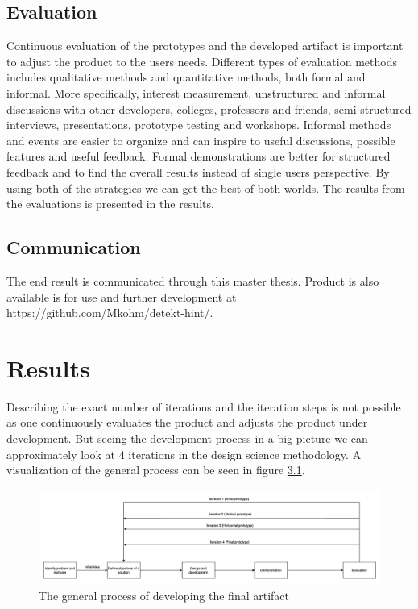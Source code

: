 \documentclass{report}
\begin{document}
\section{Evaluation}
Continuous evaluation of the prototypes and the developed artifact is important to adjust the product to the users needs. Different types of evaluation methods includes qualitative methods and quantitative methods, both formal and informal. More specifically, interest measurement, unstructured and informal discussions with other developers, colleges, professors and friends, semi structured interviews, presentations, prototype testing and workshops. Informal methods and events are easier to organize and can inspire to useful discussions, possible features and useful feedback. Formal demonstrations are better for structured feedback and to find the overall results instead of single users perspective. By using both of the strategies we can get the best of both worlds. The results from the evaluations is presented in the results.

\section{Communication}
The end result is communicated through this master thesis. Product is also available is for use and further development at https://github.com/Mkohm/detekt-hint/.

\chapter{Results}
\label{results}
Describing the exact number of iterations and the iteration steps is not possible as one continuously evaluates the product and adjusts the product under development. But seeing the development process in a big picture we can approximately look at 4 iterations in the design science methodology. A visualization of the general process can be seen in figure \ref{fig:workflow}.

\begin{figure}[h!]
    \centering
    \includegraphics[width=\linewidth]{../images/workflow.png}
    \caption{The general process of developing the final artifact}
    \label{fig:workflow}
\end{figure}
\end{document}
